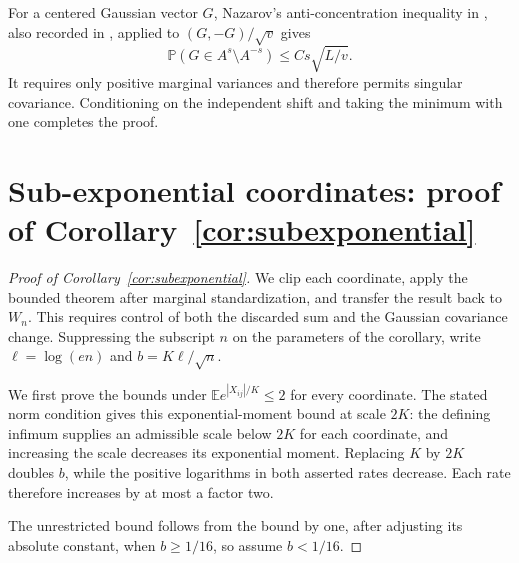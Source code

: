 \documentclass[11pt,letterpaper]{article}
\theoremstyle{remark}
\newcommand{\E}{\mathbb E}
\newcommand{\Pp}{\mathbb P}
\begin{document}
For a centered Gaussian vector \(G\), Nazarov's anti-concentration
inequality in
\cite[Lemma~A.1]{CCK2017}, also recorded in
\cite[Lemma~J.3]{CCKK2022}, applied to \((G,-G)/\sqrt v\) gives
\[
 \Pp(G\in A^{s}\setminus A^{-s})\le Cs\sqrt{L/v}.
\]
It requires only positive marginal variances and therefore permits
singular covariance. Conditioning on the independent shift and taking
the minimum with one completes the proof.

\section{\texorpdfstring{Sub-exponential coordinates: proof of Corollary~\ref{cor:subexponential}}{Sub-exponential coordinates: proof of Corollary 2}}\label{app:subexponential}
\begin{proof}[Proof of Corollary~\ref{cor:subexponential}]
We clip each coordinate, apply the bounded theorem after marginal
standardization, and transfer the result back to \(W_n\). This requires
control of both the discarded sum and the Gaussian covariance change.
Suppressing the subscript \(n\) on the parameters of the corollary,
write \(\ell=\log(en)\) and \(b=K\ell/\sqrt n\).

We first prove the bounds under \(\E e^{|X_{ij}|/K}\le2\) for every
coordinate. The stated norm condition gives this exponential-moment
bound at scale \(2K\): the defining infimum supplies an admissible
scale below \(2K\) for each coordinate, and increasing the scale
decreases its exponential moment. Replacing \(K\) by \(2K\) doubles
\(b\), while the positive logarithms in both asserted rates decrease.
Each rate therefore increases by at most a factor two.

The unrestricted bound follows from the bound by one, after adjusting its absolute
constant, when \(b\ge1/16\), so assume \(b<1/16\).


\end{proof}
\end{document}
